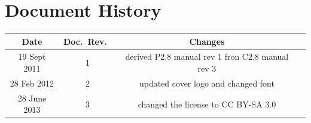 \documentclass[11pt,openany]{book}
\begin{document}
\chapter*{Document History}

\begin{table}[htdp]
\begin{center}
\begin{tabular}{|c|c|c|c|}
\hline
Date 		& Doc.\ Rev.\ & Changes \\ \hline \hline
19 Sept 2011	& 1	& derived P2.8 manual rev 1 fron C2.8 manual rev 3 \\
\hline
28 Feb 2012	& 2	& updated cover logo and changed font  \\
\hline
28 June 2013   & 3 & changed the license to CC BY-SA 3.0 \\
\hline
\end{tabular}
\end{center}
\label{default}
\end{table}%

 
\end{document}
